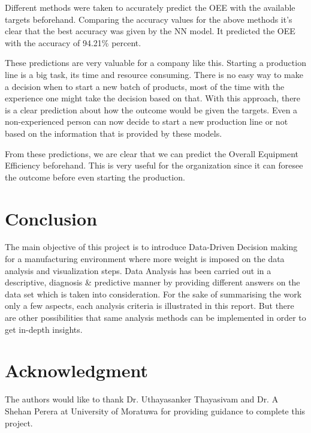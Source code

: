 Different methods were taken to accurately predict the OEE with the available targets beforehand. Comparing the accuracy values for the above methods it's clear that the best accuracy was given by the NN model. It predicted the OEE with the accuracy of 94.21\% percent. 

These predictions are very valuable for a company like this. Starting a production line is a big task, its time and resource consuming. There is no easy way to make a decision when to start a new batch of products, most of the time with the experience one might take the decision based on that. With this approach, there is a clear prediction about how the outcome would be given the targets. Even a non-experienced person can now decide to start a new production line or not based on the information that is provided by these models.  

From these predictions, we are clear that we can predict the Overall Equipment Efficiency beforehand. This is very useful for the organization since it can foresee the outcome before even starting the production. 


\section{Conclusion}
The main objective of this project is to introduce Data-Driven Decision making for a manufacturing environment where more weight is imposed on the data analysis and visualization steps. Data Analysis has been carried out in a descriptive, diagnosis \&  predictive manner by providing different answers on the data set which is taken into consideration. For the sake of summarising the work only a few aspects, each analysis criteria is illustrated in this report. But there are other possibilities that same analysis methods can be implemented in order to get in-depth insights. 


\section*{Acknowledgment}


The  authors  would  like  to  thank  Dr. Uthayasanker Thayasivam and  Dr. A Shehan Perera  at University of Moratuwa for providing guidance to complete this project. 

